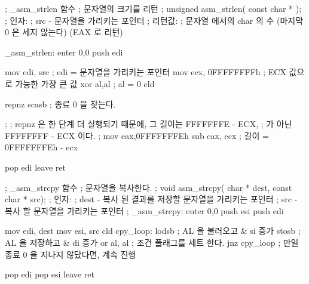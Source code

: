 \begin{AsmCodeListing}[label=memory.asm]
; _asm_strlen 함수
; 문자열의 크기를 리턴
; unsigned asm_strlen( const char * );
; 인자:
;   src - 문자열을 가리키는 포인터
; 리턴값:
;   문자열 에서의 char 의 수 (마지막 0 은 세지 않는다) (EAX 로 리턴)

_asm_strlen:
        enter   0,0
        push    edi

        mov     edi, src        ; edi = 문자열을 가리키는 포인터
        mov     ecx, 0FFFFFFFFh ; ECX 값으로 가능한 가장 큰 값
        xor     al,al           ; al = 0
        cld

        repnz   scasb           ; 종료 0 을 찾는다. 

;
; repnz 은 한 단계 더 실행되기 때문에, 그 길이는 FFFFFFFE - ECX,
; 가 아닌 FFFFFFFF - ECX 이다. 
;
        mov     eax,0FFFFFFFEh
        sub     eax, ecx        ; 길이 = 0FFFFFFFEh - ecx

        pop     edi
        leave
        ret

; _asm_strcpy 함수
; 문자열을 복사한다.
; void asm_strcpy( char * dest, const char * src);
; 인자:
;   dest - 복사 된 결과를 저장할 문자열을 가리키는 포인터
;   src  - 복사 할 문자열을 가리키는 포인터 
; 
_asm_strcpy:
        enter   0,0
        push    esi
        push    edi

        mov     edi, dest
        mov     esi, src
        cld
cpy_loop:
        lodsb                   ; AL 을 불러오고 & si 증가
        stosb                   ; AL 을 저장하고 & di 증가
        or      al, al          ; 조건 플래그를 세트 한다.
        jnz     cpy_loop        ; 만일 종료 0 을 지나지 않닸다면, 계속 진행

        pop     edi
        pop     esi
        leave
        ret
\end{AsmCodeListing}


